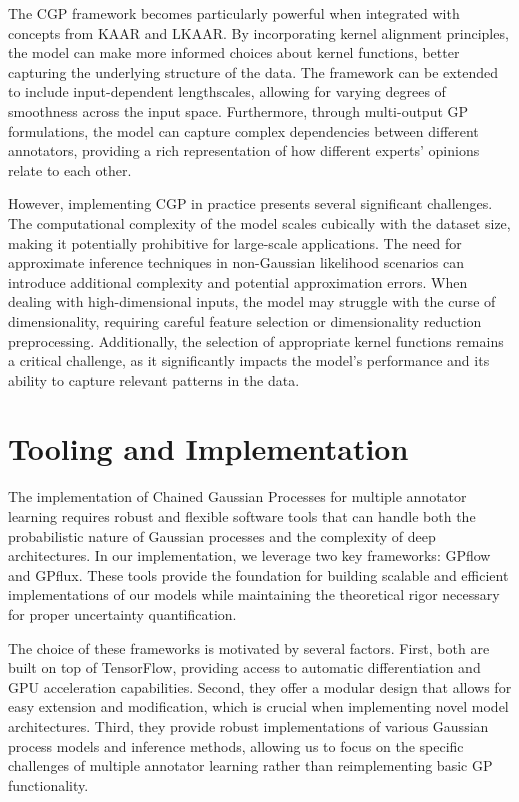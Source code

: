 The CGP framework becomes particularly powerful when integrated with
concepts from KAAR and LKAAR. By incorporating kernel alignment
principles, the model can make more informed choices about kernel
functions, better capturing the underlying structure of the data. The
framework can be extended to include input-dependent lengthscales,
allowing for varying degrees of smoothness across the input space.
Furthermore, through multi-output GP formulations, the model can
capture complex dependencies between different annotators, providing
a rich representation of how different experts' opinions relate to each other.

However, implementing CGP in practice presents several significant
challenges. The computational complexity of the model scales
cubically with the dataset size, making it potentially prohibitive
for large-scale applications. The need for approximate inference
techniques in non-Gaussian likelihood scenarios can introduce
additional complexity and potential approximation errors. When
dealing with high-dimensional inputs, the model may struggle with the
curse of dimensionality, requiring careful feature selection or
dimensionality reduction preprocessing. Additionally, the selection
of appropriate kernel functions remains a critical challenge, as it
significantly impacts the model's performance and its ability to
capture relevant patterns in the data.

\section{Tooling and Implementation}\label{sec:tooling}

The implementation of Chained Gaussian Processes for multiple
annotator learning requires robust and flexible software tools that
can handle both the probabilistic nature of Gaussian processes and
the complexity of deep architectures. In our implementation, we
leverage two key frameworks: GPflow and GPflux. These tools provide
the foundation for building scalable and efficient implementations of
our models while maintaining the theoretical rigor necessary for
proper uncertainty quantification.

The choice of these frameworks is motivated by several factors.
First, both are built on top of TensorFlow, providing access to
automatic differentiation and GPU acceleration capabilities. Second,
they offer a modular design that allows for easy extension and
modification, which is crucial when implementing novel model
architectures. Third, they provide robust implementations of various
Gaussian process models and inference methods, allowing us to focus
on the specific challenges of multiple annotator learning rather than
reimplementing basic GP functionality.

